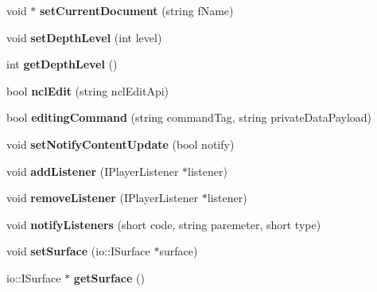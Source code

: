 \begin{CompactItemize}
\item 
void $\ast$ \textbf{setCurrentDocument} (string fName)\label{classbr_1_1pucrio_1_1telemidia_1_1ginga_1_1ncl_1_1FormatterMediator_07fb349814c8b84ef6fb7009939b8e3a}

\item 
void \textbf{setDepthLevel} (int level)\label{classbr_1_1pucrio_1_1telemidia_1_1ginga_1_1ncl_1_1FormatterMediator_6cc1df8863810a31889fd61256f04076}

\item 
int \textbf{getDepthLevel} ()\label{classbr_1_1pucrio_1_1telemidia_1_1ginga_1_1ncl_1_1FormatterMediator_ac5a7abaf1bd5e762c9b23ebd5b562ed}

\item 
bool \textbf{nclEdit} (string nclEditApi)\label{classbr_1_1pucrio_1_1telemidia_1_1ginga_1_1ncl_1_1FormatterMediator_04c7b492f2acb320dbebc13826e2e381}

\item 
bool \textbf{editingCommand} (string commandTag, string privateDataPayload)\label{classbr_1_1pucrio_1_1telemidia_1_1ginga_1_1ncl_1_1FormatterMediator_b49a1cfe9ef8b4e0dbf4bd1343ff3a98}

\item 
void {\bf setNotifyContentUpdate} (bool notify)\label{classbr_1_1pucrio_1_1telemidia_1_1ginga_1_1ncl_1_1FormatterMediator_ca00facc9165918bf92568a3396e4680}

\item 
void \textbf{addListener} (IPlayerListener $\ast$listener)\label{classbr_1_1pucrio_1_1telemidia_1_1ginga_1_1ncl_1_1FormatterMediator_63a662b680a51cc10d016e3c0fe0a818}

\item 
void \textbf{removeListener} (IPlayerListener $\ast$listener)\label{classbr_1_1pucrio_1_1telemidia_1_1ginga_1_1ncl_1_1FormatterMediator_3bf91c9c826b2cc663dfb3c6fb928bb3}

\item 
void \textbf{notifyListeners} (short code, string paremeter, short type)\label{classbr_1_1pucrio_1_1telemidia_1_1ginga_1_1ncl_1_1FormatterMediator_8e6dd31d99639b4c0cf80e9b7bdad206}

\item 
void \textbf{setSurface} (io::ISurface $\ast$surface)\label{classbr_1_1pucrio_1_1telemidia_1_1ginga_1_1ncl_1_1FormatterMediator_9aa3a8ba07aa4805e9e9e88123e394ed}

\item 
io::ISurface $\ast$ \textbf{getSurface} ()\label{classbr_1_1pucrio_1_1telemidia_1_1ginga_1_1ncl_1_1FormatterMediator_29605d317089ca197065ef56994f5d4c}


\end{CompactItemize}

